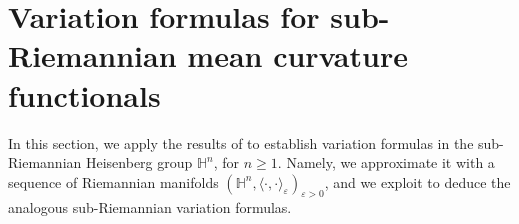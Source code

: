\documentclass[11pt]{amsart}
\renewcommand{\geq}{\geqslant}
\newcommand{\n}[1]{\nabla^\varepsilon_{ #1 }}
\newcommand{\hh}{{\mathbb{H}}}
\newcommand{\eps}{\varepsilon}
\renewcommand{\j}{\mathcal{C}}
\renewcommand{\k}{\kappa}
\renewcommand{\n}{\mathbf{N}}
\DeclareMathOperator{\ric}{Ric}
\DeclareMathOperator{\divv}{div}
\theoremstyle{definition}
\theoremstyle{remark}
\numberwithin{equation}{section}
\begin{document}
\section{Variation formulas for sub-Riemannian mean curvature functionals}\label{appendicesubriem}
   In this section, we apply the results of  to establish variation formulas in the sub-Riemannian Heisenberg group $\hh^n$, for $n\geq 1$. Namely, we approximate it with a sequence of Riemannian manifolds $(\hh^n,\langle\cdot,\cdot\rangle_\eps)_{\eps>0}$, and we exploit  to deduce the analogous sub-Riemannian variation formulas. 
   
\end{document}
